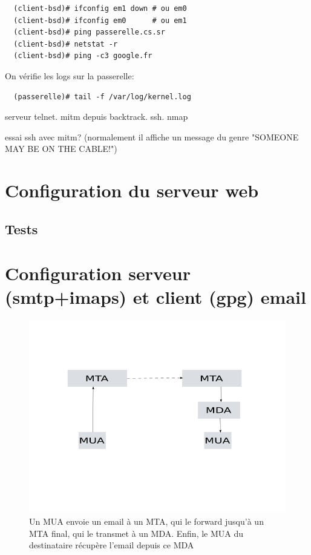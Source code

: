 \documentclass[a4paper]{article}
\begin{document}
\begin{verbatim}
  (client-bsd)# ifconfig em1 down # ou em0
  (client-bsd)# ifconfig em0      # ou em1
  (client-bsd)# ping passerelle.cs.sr
  (client-bsd)# netstat -r 
  (client-bsd)# ping -c3 google.fr
\end{verbatim}

On vérifie les logs sur la passerelle:
\begin{verbatim}
  (passerelle)# tail -f /var/log/kernel.log
\end{verbatim}

serveur telnet. mitm depuis backtrack. ssh. nmap

essai ssh avec mitm? (normalement il affiche un message du genre
"SOMEONE MAY BE ON THE CABLE!")

\section{Configuration du serveur web}
\subsection{Tests}

\section{Configuration serveur (smtp+imaps) et client (gpg) email}
\begin{figure}[!ht]
	\centering
	\includegraphics[scale=.5]{emailrouting.png}
	\caption{\label{emailrouting} Un MUA envoie un email à un MTA, qui
		le forward jusqu'à un MTA final, qui le transmet à un MDA.
		Enfin, le MUA du destinataire récupère l'email depuis ce MDA}
\end{figure}
\end{document}
